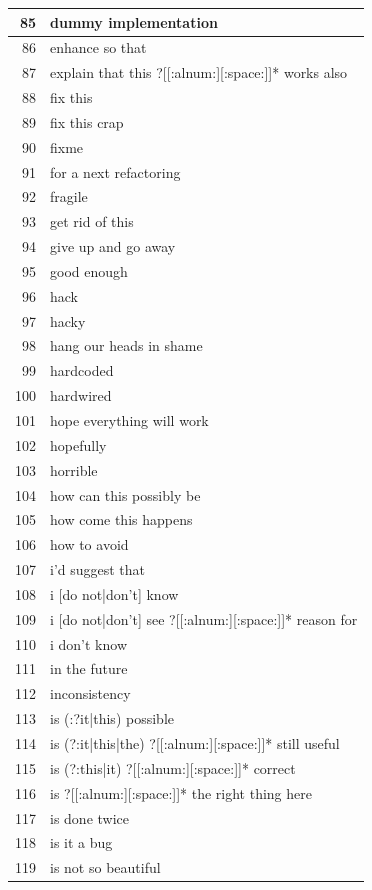 \documentclass[
]{article}
\begin{document}
\begin{longtable}{r|l}
\hline
85 & dummy implementation\\
\hline
86 & enhance so that\\
\hline
87 & explain that this ?[[:alnum:][:space:]]* works also\\
\hline
88 & fix this\\
\hline
89 & fix this crap\\
\hline
90 & fixme\\
\hline
91 & for a next refactoring\\
\hline
92 & fragile\\
\hline
93 & get rid of this\\
\hline
94 & give up and go away\\
\hline
95 & good enough\\
\hline
96 & hack\\
\hline
97 & hacky\\
\hline
98 & hang our heads in shame\\
\hline
99 & hardcoded\\
\hline
100 & hardwired\\
\hline
101 & hope everything will work\\
\hline
102 & hopefully\\
\hline
103 & horrible\\
\hline
104 & how can this possibly be\\
\hline
105 & how come this happens\\
\hline
106 & how to avoid\\
\hline
107 & i'd suggest that\\
\hline
108 & i [do not|don't] know\\
\hline
109 & i [do not|don't] see ?[[:alnum:][:space:]]* reason for\\
\hline
110 & i don't know\\
\hline
111 & in the future\\
\hline
112 & inconsistency\\
\hline
113 & is (:?it|this) possible\\
\hline
114 & is (?:it|this|the) ?[[:alnum:][:space:]]* still useful\\
\hline
115 & is (?:this|it) ?[[:alnum:][:space:]]* correct\\
\hline
116 & is ?[[:alnum:][:space:]]* the right thing here\\
\hline
117 & is done twice\\
\hline
118 & is it a bug\\
\hline
119 & is not so beautiful\\

\end{longtable}
\end{document}
